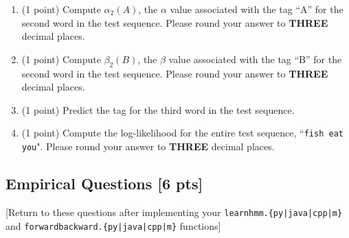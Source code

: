 \documentclass{article}
\begin{document}
\clearpage

\begin{enumerate}
    \item (1 point) Compute $\alpha_2(A)$, the $\alpha$ value associated with the tag ``A'' for the second word in the test sequence. Please round your answer to \textbf{THREE} decimal places.
    
    \begin{tcolorbox}[fit,height=1cm, width=2cm, blank, borderline={1pt}{-2pt}]
        \end{tcolorbox}
    

    \item (1 point) Compute $\beta_2(B)$, the $\beta$ value associated with the tag ``B'' for the second word in the test sequence. Please round your answer to \textbf{THREE} decimal places.
    
    \begin{tcolorbox}[fit,height=1cm, width=2cm, blank, borderline={1pt}{-2pt}]
        \end{tcolorbox}
    
    \item (1 point) Predict the tag for the third word in the test sequence. 
    
    \begin{tcolorbox}[fit,height=1cm, width=2cm, blank, borderline={1pt}{-2pt}]
        \end{tcolorbox}
    
    \item (1 point) Compute the log-likelihood for the entire test sequence, ``\texttt{fish eat you}". Please round your answer to \textbf{THREE} decimal places.
    
    \begin{tcolorbox}[fit,height=1cm, width=2cm, blank, borderline={1pt}{-2pt}]
        \end{tcolorbox}
    
\end{enumerate}


\clearpage

\subsection{Empirical Questions [6 pts]}
[Return to these questions after implementing your \texttt{learnhmm.\{py|java|cpp|m\}} and \texttt{forwardbackward.\{py|java|cpp|m\}} functions]
\end{document}
